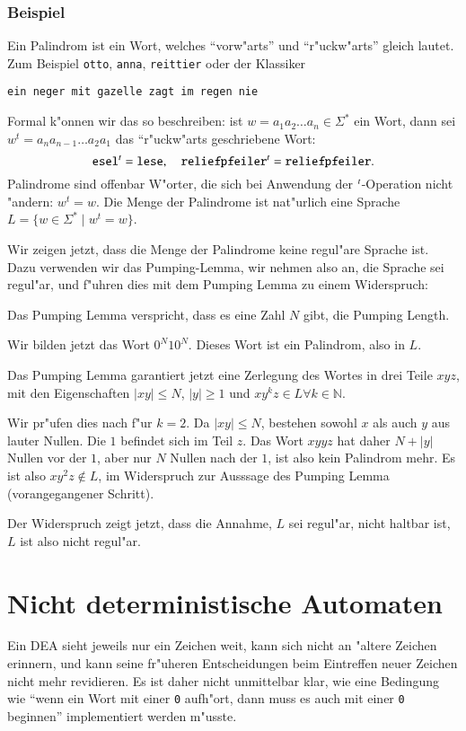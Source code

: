 \subsubsection{Beispiel}
Ein Palindrom ist ein Wort, welches ``vorw"arts'' und ``r"uckw"arts''
gleich lautet. Zum Beispiel {\tt otto}, {\tt anna}, {\tt reittier} oder der
Klassiker
\begin{center}
{\tt ein neger mit gazelle zagt im regen nie}
\end{center}
Formal k"onnen wir das so beschreiben: ist $w=a_1a_2\dots a_n\in\Sigma^*$
ein Wort, dann sei $w^t=a_na_{n-1}\dots a_2a_1$ das ``r"uckw"arts
geschriebene Wort:
\[
{\tt esel}^t={\tt lese},\quad {\tt reliefpfeiler}^t={\tt reliefpfeiler}.
\]
Palindrome sind offenbar W"orter, die sich bei Anwendung der
$\mathstrut^t$-Operation nicht "andern: $w^t=w$. Die Menge der Palindrome
ist nat"urlich eine Sprache $L=\{w\in\Sigma^*\;|\;w^t=w\}$. 

Wir zeigen jetzt, dass die Menge der Palindrome keine regul"are Sprache ist.
Dazu verwenden wir das Pumping-Lemma, wir nehmen also an, die Sprache
sei regul"ar, und f"uhren dies mit dem Pumping Lemma zu einem
Widerspruch:
\begin{compactenum}
\item Das Pumping Lemma verspricht, dass es eine Zahl $N$ gibt, die
Pumping Length.
\item Wir bilden jetzt das Wort $0^N10^N$. Dieses Wort ist ein Palindrom,
also in $L$.
\item Das Pumping Lemma garantiert jetzt eine Zerlegung des Wortes
in drei Teile $xyz$, mit den Eigenschaften $|xy|\le N$, $|y|\ge 1$ und
$xy^kz\in L\forall k\in\mathbb N$.
\item Wir pr"ufen dies nach f"ur $k=2$. Da $|xy|\le N$, bestehen
sowohl $x$ als auch $y$ aus lauter Nullen. Die $1$ befindet sich im Teil $z$.
Das Wort $xyyz$ hat daher $N+|y|$ Nullen vor der $1$, aber nur $N$ Nullen
nach der $1$, ist also kein Palindrom mehr. Es ist also $xy^2z\not\in L$,
im Widerspruch zur Ausssage des Pumping Lemma (vorangegangener Schritt).
\end{compactenum}
Der Widerspruch zeigt jetzt, dass die Annahme, $L$ sei regul"ar, nicht
haltbar ist, $L$ ist also nicht regul"ar.

\section{Nicht deterministische Automaten\label{regulaer:nea}}
Ein DEA sieht jeweils nur ein Zeichen weit, kann sich nicht an "altere
Zeichen erinnern, und kann seine fr"uheren Entscheidungen beim Eintreffen
neuer Zeichen nicht mehr revidieren. Es ist daher nicht unmittelbar klar,
wie eine Bedingung wie ``wenn ein
Wort mit einer {\tt 0} aufh"ort, dann muss es auch mit einer {\tt 0}
beginnen'' implementiert werden m"usste.

